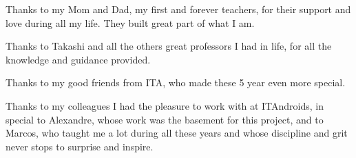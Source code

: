 
Thanks to my Mom and Dad, my first and forever teachers, for their support and love during all my life. They built great part of what I am.

Thanks to Takashi and all the others great professors I had in life, for all the knowledge and guidance provided.

Thanks to my good friends from ITA, who made these 5 year even more special.

Thanks to my colleagues I had the pleasure to work with at ITAndroids, in special to Alexandre, whose work was the basement for this project, and to Marcos, who taught me a lot during all these years and whose discipline and grit never stops to surprise and inspire.